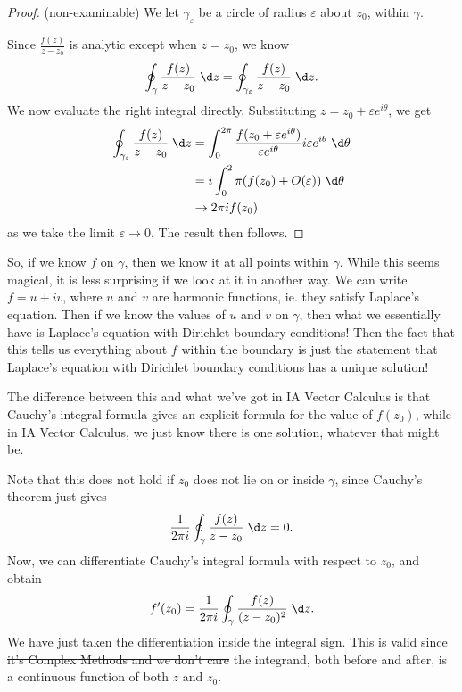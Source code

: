 \documentclass[a4paper]{article}
\begin{document}
\begin{proof}(non-examinable)
  We let $\gamma_\varepsilon$ be a circle of radius $\varepsilon$ about $z_0$, within $\gamma$.
  \begin{center}
  \end{center}
  Since $\frac{f(z)}{z - z_0}$ is analytic except when $z = z_0$, we know
  \[
    \oint_\gamma \frac{f(z)}{z - z_0} \;\d z = \oint_{\gamma_\varepsilon} \frac{f(z)}{z - z_0}\;\d z.
  \]
  We now evaluate the right integral directly. Substituting $z = z_0 + \varepsilon e^{i\theta}$, we get
  \begin{align*}
    \oint_{\gamma_\varepsilon} \frac{f(z)}{z - z_0}\;\d z &= \int_0^{2\pi} \frac{f(z_0 + \varepsilon e^{i\theta})}{\varepsilon e^{i\theta}} i\varepsilon e^{i\theta} \;\d \theta\\
    &= i\int_0^2\pi (f(z_0) + O(\varepsilon))\;\d \theta\\
    &\rightarrow 2\pi i f(z_0)
  \end{align*}
  as we take the limit $\varepsilon \to 0$. The result then follows.
\end{proof}
So, if we know $f$ on $\gamma$, then we know it at all points within $\gamma$. While this seems magical, it is less surprising if we look at it in another way. We can write $f = u + iv$, where $u$ and $v$ are harmonic functions, ie. they satisfy Laplace's equation. Then if we know the values of $u$ and $v$ on $\gamma$, then what we essentially have is Laplace's equation with Dirichlet boundary conditions! Then the fact that this tells us everything about $f$ within the boundary is just the statement that Laplace's equation with Dirichlet boundary conditions has a unique solution!

The difference between this and what we've got in IA Vector Calculus is that Cauchy's integral formula gives an explicit formula for the value of $f(z_0)$, while in IA Vector Calculus, we just know there is one solution, whatever that might be.

Note that this does not hold if $z_0$ does not lie on or inside $\gamma$, since Cauchy's theorem just gives
\[
  \frac{1}{2\pi i} \oint_\gamma \frac{f(z)}{z - z_0} \;\d z = 0.
\]
Now, we can differentiate Cauchy's integral formula with respect to $z_0$, and obtain
\[
  f'(z_0) = \frac{1}{2\pi i} \oint_\gamma \frac{f(z)}{(z - z_0)^2}\;\d z.
\]
We have just taken the differentiation inside the integral sign. This is valid since \st{it's Complex Methods and we don't care} the integrand, both before and after, is a continuous function of both $z$ and $z_0$.
\end{document}
